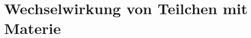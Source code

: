 \documentclass{article}
\begin{document}



\section{Wechselwirkung von Teilchen mit Materie}
\graphicspath{{bilder/1-1/}}
% 		
% 				
% 				
% 				
% 				
% 				
% 				
% 				
% 				
\end{document}
